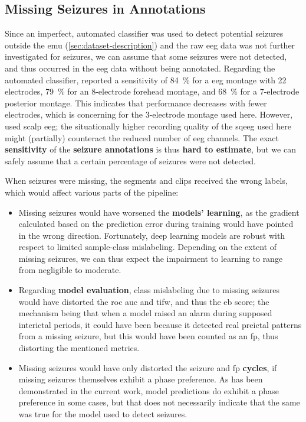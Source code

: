 \subsection{Missing Seizures in Annotations}
Since an imperfect, automated classifier was used to detect potential seizures outside the \gls{emu} (\cref{sec:dataset-description}) and the raw \gls{eeg} data was not further investigated for seizures, we can assume that some seizures were not detected, and thus occurred in the \gls{eeg} data without being annotated.
Regarding the automated classifier, \textcite{furbass_automatic_2017} reported a sensitivity of \SI{84}{\percent} for a \gls{eeg} montage with 22 electrodes, \SI{79}{\percent} for an 8-electrode forehead montage, and \SI{68}{\percent} for a 7-electrode posterior montage.
This indicates that performance decreases with fewer electrodes, which is concerning for the 3-electrode montage used here.
However, \textcite{furbass_automatic_2017} used scalp \gls{eeg}; the situationally higher recording quality of the \gls{sqeeg} used here might (partially) counteract the reduced number of \gls{eeg} channels. 
The exact \textbf{sensitivity} of the \textbf{seizure annotations} is thus \textbf{hard to estimate}, but we can safely assume that a certain percentage of seizures were not detected.

When seizures were missing, the segments and clips received the wrong labels, which would affect various parts of the pipeline:
\begin{itemize}
    \item Missing seizures would have worsened the \textbf{models' learning}, as the gradient calculated based on the prediction error during training would have pointed in the wrong direction.
    Fortunately, deep learning models are robust with respect to limited sample-class mislabeling.
    Depending on the extent of missing seizures, we can thus expect the impairment to learning to range from negligible to moderate.

    \item Regarding \textbf{model evaluation}, class mislabeling due to missing seizures would have distorted the \gls{roc auc} and \gls{tifw}, and thus the \gls{eb} score;
    the mechanism being that when a model raised an alarm during supposed interictal periods, it could have been because it detected real preictal patterns from a missing seizure, but this would have been counted as an \gls{fp}, thus distorting the mentioned metrics.

    \item Missing seizures would have only distorted the seizure and \gls{fp} \textbf{cycles}, if missing seizures themselves exhibit a phase preference.
    As has been demonstrated in the current work, model predictions do exhibit a phase preference in some cases, but that does not necessarily indicate that the same was true for the model used to detect seizures.
\end{itemize}

